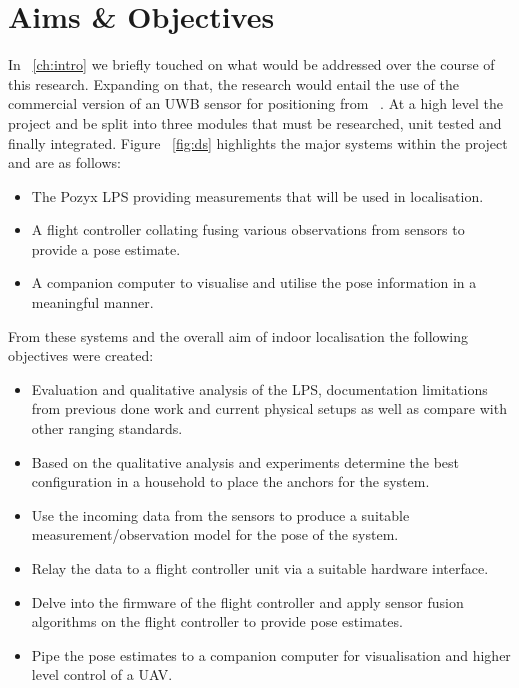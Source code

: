 \section{Aims \& Objectives}\label{sec:aims_objs}

    In ~\ref{ch:intro} we briefly touched on what would be addressed over the course of this research.
Expanding on that, the research would entail the use of the commercial version of an UWB sensor for positioning from ~\cite{pozyx2018pozyx}.
At a high level the project and be split into three modules that must be researched, unit tested and finally integrated.
Figure ~\ref{fig:ds} highlights the major systems within the project and are as follows:
\begin{itemize}
    \item The Pozyx LPS providing measurements that will be used in localisation.
    \item A flight controller collating fusing various observations from sensors to provide a pose estimate.
    \item A companion computer to visualise and utilise the pose information in a meaningful manner.
\end{itemize}

From these systems and the overall aim of indoor localisation the following objectives were created:
\begin{itemize}
    \item Evaluation and qualitative analysis of the LPS, documentation limitations from previous done work and current physical setups as well as compare with other ranging standards.
    \item Based on the qualitative analysis and experiments determine the best configuration in a household to place the anchors for the system.
    \item Use the incoming data from the sensors to produce a suitable measurement/observation model for the pose of the system.
    \item Relay the data to a flight controller unit via a suitable hardware interface.
    \item Delve into the firmware of the flight controller and apply sensor fusion algorithms on the flight controller to provide pose estimates.
    \item Pipe the pose estimates to a companion computer for visualisation and higher level control of a UAV.
\end{itemize}

